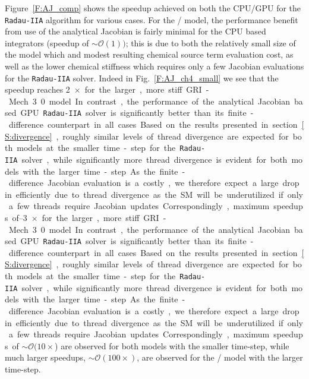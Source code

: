 \documentclass[final,twocolumn]{elsarticle}
\begin{document}
Figure~\ref{F:AJ_comp} shows the speedup achieved on both the CPU\slash GPU for the \texttt{Radau-IIA} algorithm for various cases.
For the \slash{} model, the performance benefit from use of the analytical Jacobian is fairly minimal for the CPU based integrators (speedup of $\sim\mathcal{O}(1))$; this is due to both the relatively small size of the model which and modest resulting chemical source term evaluation cost, as well as the lower chemical stiffness which requires only a few Jacobian evaluations for the \texttt{Radau-IIA} solver.
Indeed in Fig.~\ref{F:AJ_ch4_small} we see that the speedup reaches \SIrange{2}{3}{$\times$} for the larger, more stiff GRI-Mech 3.0 model.
In contrast, the performance of the analytical Jacobian based GPU \texttt{Radau-IIA} solver is significantly better than its finite-difference counterpart in all cases.
Based on the results presented in section~\ref{S:divergence}, roughly similar levels of thread divergence are expected for both models at the smaller time-step for the \texttt{Radau-IIA} solver, while significantly more thread divergence is evident for both models with the larger time-step.
As the finite-difference Jacobian evaluation is a costly, we therefore expect a large drop in efficiently due to thread divergence as the SM will be underutilized if only a few threads require Jacobian updates.
Correspondingly, maximum speedups of $\sim\mathcal{O}(10\times$) are observed for both models with the smaller time-step, while much larger speedups, $\sim\mathcal{O}(100\times)$, are observed for the \slash{} model with the larger time-step.
\end{document}
